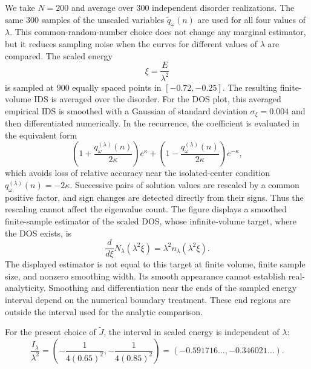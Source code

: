 \documentclass[12pt,a4paper]{article}
\numberwithin{equation}{section}
\begin{document}
We take $N=200$ and average over $300$ independent disorder realizations.  The
same $300$ samples of the unscaled variables $\widetilde q_\omega(n)$ are used
for all four values of $\lambda$.  This common-random-number choice does not
change any marginal estimator, but it reduces sampling noise when the curves
for different values of $\lambda$ are compared.  The scaled energy
$$
\xi=\frac{E}{\lambda^2}
$$
is sampled at $900$ equally spaced points in $[-0.72,-0.25]$.  The resulting finite-volume IDS is averaged over the disorder.  For the DOS
plot, this averaged empirical IDS is smoothed with a Gaussian of standard
deviation $\sigma_\xi=0.004$ and then differentiated numerically.  In the
recurrence, the coefficient is evaluated in the equivalent form
$$
 \left(1+\frac{q_\omega^{(\lambda)}(n)}{2\kappa}\right)e^\kappa
 +\left(1-\frac{q_\omega^{(\lambda)}(n)}{2\kappa}\right)e^{-\kappa},
$$
which avoids loss of relative accuracy near the isolated-center condition
$q_\omega^{(\lambda)}(n)=-2\kappa$.  Successive pairs of solution values are
rescaled by a common positive factor, and sign changes are detected directly
from their signs.  Thus the rescaling cannot affect the eigenvalue count.
The figure displays a smoothed finite-sample estimator of the scaled DOS, whose
infinite-volume target, where the DOS exists, is
\begin{equation}
 \frac{d}{d\xi}N_\lambda(\lambda^2\xi)
 =\lambda^2 n_\lambda(\lambda^2\xi).
\label{scaled-DOS-target}
\end{equation}
The displayed estimator is not equal to this target at finite volume, finite
sample size, and nonzero smoothing width.  Its smooth appearance cannot
establish real-analyticity.  Smoothing and differentiation near the ends of
the sampled energy interval depend on the numerical boundary treatment.
These end regions are outside the interval used for the analytic comparison.

For the present choice of $\widetilde J$, the interval in scaled energy is independent of $\lambda$:
\begin{equation}
\frac{I_\lambda}{\lambda^2}
=\left(
-\frac{1}{4(0.65)^2},
-\frac{1}{4(0.85)^2}
\right)
=(-0.591716\ldots,-0.346021\ldots).
\label{scaled-analyticity-interval}
\end{equation}
\end{document}
